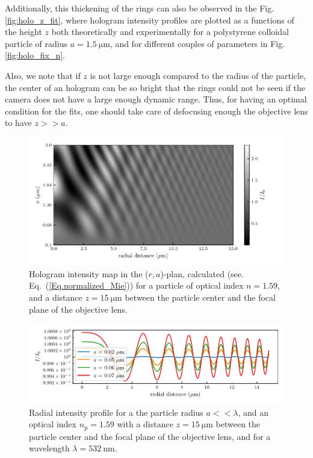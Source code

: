 Additionally, this thickening of the rings can also be observed in the Fig.\ref{fig:holo_z_fit}, where hologram intensity profiles are plotted as a functions of the height $z$ both theoretically and experimentally for a polystyrene colloidal particle of radius  $a = 1.5 ~ \mathrm{\mu m} $, and for different couples of parameters in Fig.\ref{fig:holo_fix_n}.

Also, we note that if $z$ is not large enough compared to the radius of the particle, the center of an hologram can be so bright that the rings could not be seen if the camera does not have a large enough dynamic range.  Thus, for having an optimal condition for the fits, one should take care of defocusing enough the objective lens to have $z >> a$.





\begin{figure}
	\centering
	\includegraphics{02_body/chapter2/images/holo_size_exemple/holos_only_r.pdf}
	\caption{Hologram intensity map in the ($r,a$)-plan, calculated (see. Eq.~(\ref{Eq.normalized_Mie})) for a particle of optical index $n = 1.59$, and a distance $z = 15 ~\mathrm{\mu m}$ between the particle center and the focal plane of the objective lens.}
	\label{fig:holo_onlyr}
\end{figure}

\begin{figure}[H]
	\centering
	\includegraphics{02_body/chapter2/images/holo_size_exemple/smallparticles.pdf}
	\caption{Radial intensity profile for a the particle radius $a << \lambda$, and an optical index $n_\mathrm{p} = 1.59$ with a distance $z = 15 ~\mathrm{\mu m}$ between the particle center and the focal plane of the objective lens, and for a wavelength $\lambda = 532 ~ \mathrm{nm}$.}
	\label{fig:small_part_holo}
\end{figure}


